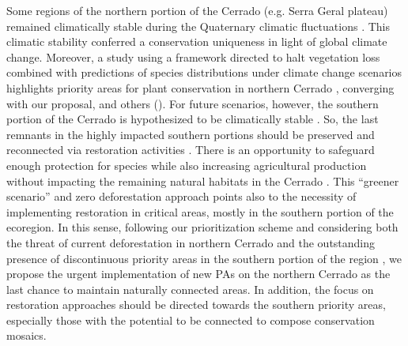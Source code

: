 \documentclass[12pt,openright,oneside,a4paper,english]{abntex2}
\begin{document}
Some regions of the northern portion of the Cerrado (e.g. Serra Geral plateau) remained climatically stable during the Quaternary climatic fluctuations \citep{Werneck2012}. This climatic stability conferred a conservation uniqueness in light of global climate change. Moreover, a study using a framework directed to halt vegetation loss combined with predictions of species distributions under climate change scenarios highlights priority areas for plant conservation in northern Cerrado \citep{Monteiro2020}, converging with our proposal, and others (\citealp[e.g.][]{Brum2019, DinizFilho2020, Pacheco2021}). For future scenarios, however, the southern portion of the Cerrado is hypothesized to be climatically stable \citep{deMarcoJr2020, DinizFilho2020}. So, the last remnants in the highly impacted southern portions should be preserved and reconnected via restoration activities \citep{Strassburg2017}. There is an opportunity to safeguard enough protection for species while also increasing agricultural production without impacting the remaining natural habitats in the Cerrado \citep{Strassburg2017}. This “greener scenario” and zero deforestation approach points also to the necessity of implementing restoration in critical areas, mostly in the southern portion of the ecoregion. In this sense, following our prioritization scheme and considering both the threat of current deforestation in northern Cerrado and the outstanding presence of discontinuous priority areas in the southern portion of the region \citep{Grande2020}, we propose the urgent implementation of new PAs on the northern Cerrado as the last chance to maintain naturally connected areas. In addition, the focus on restoration approaches should be directed towards the southern priority areas, especially those with the potential to be connected to compose conservation mosaics.
\end{document}
